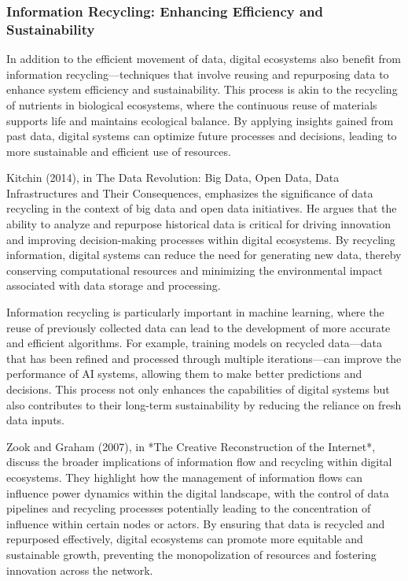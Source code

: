 \documentclass[12pt,twoside]{article}
\begin{document}
\subsubsection{Information Recycling: Enhancing Efficiency and Sustainability}

In addition to the efficient movement of data, digital ecosystems also benefit from information recycling—techniques that involve reusing and repurposing data to enhance system efficiency and sustainability. This process is akin to the recycling of nutrients in biological ecosystems, where the continuous reuse of materials supports life and maintains ecological balance. By applying insights gained from past data, digital systems can optimize future processes and decisions, leading to more sustainable and efficient use of resources.

Kitchin (2014), in The Data Revolution: Big Data, Open Data, Data Infrastructures and Their Consequences, emphasizes the significance of data recycling in the context of big data and open data initiatives. He argues that the ability to analyze and repurpose historical data is critical for driving innovation and improving decision-making processes within digital ecosystems. By recycling information, digital systems can reduce the need for generating new data, thereby conserving computational resources and minimizing the environmental impact associated with data storage and processing.

Information recycling is particularly important in machine learning, where the reuse of previously collected data can lead to the development of more accurate and efficient algorithms. For example, training models on recycled data—data that has been refined and processed through multiple iterations—can improve the performance of AI systems, allowing them to make better predictions and decisions. This process not only enhances the capabilities of digital systems but also contributes to their long-term sustainability by reducing the reliance on fresh data inputs.

Zook and Graham (2007), in *The Creative Reconstruction of the Internet*, discuss the broader implications of information flow and recycling within digital ecosystems. They highlight how the management of information flows can influence power dynamics within the digital landscape, with the control of data pipelines and recycling processes potentially leading to the concentration of influence within certain nodes or actors. By ensuring that data is recycled and repurposed effectively, digital ecosystems can promote more equitable and sustainable growth, preventing the monopolization of resources and fostering innovation across the network.
\end{document}
